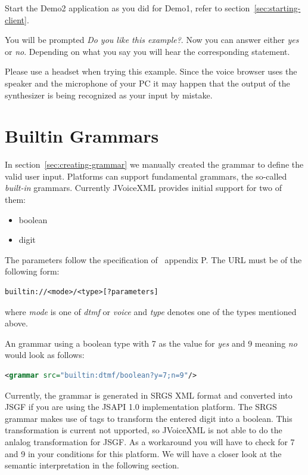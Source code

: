 \documentclass[11pt,a4paper]{book}
\begin{document}
Start the Demo2 application as you did for Demo1, refer to
section~\ref{sec:starting-client}.

You will be prompted \emph{Do you like this example?}. Now you can answer
either \emph{yes} or \emph{no}. Depending on what you say you will hear the
corresponding statement.

Please use a headset when trying this example. Since the voice browser uses the
speaker and the microphone of your PC it may happen that the output of the
synthesizer is being recognized as your input by mistake.

\section{Builtin Grammars}

In section~\ref{sec:creating-grammar} we manually created the grammar to
define the valid user input. Platforms can support fundamental grammars, the
so-called \emph{built-in} grammars. Currently JVoiceXML provides initial support
for two of them:
\begin{itemize}
  \item boolean
  \item digit
\end{itemize}

The parameters follow the specification of~\cite{w3.org:voicexml} appendix P.
The URL must be of the following form:

\begin{lstlisting}
builtin://<mode>/<type>[?parameters]
\end{lstlisting}

where \emph{mode} is one of \emph{dtmf} or \emph{voice} and \emph{type} denotes
one of the types mentioned above.

An grammar using a boolean type with 7 as the value for \emph{yes} and 9
meaning \emph{no} would look as follows:

\begin{lstlisting}[language=XML]
<grammar src="builtin:dtmf/boolean?y=7;n=9"/>
\end{lstlisting}

Currently, the grammar is generated in SRGS XML format and converted into JSGF
if you are using the JSAPI 1.0 implementation platform. The SRGS grammar
makes use of tags to transform the entered digit into a boolean. This
transformation is current not upported, so JVoiceXML is not able to do the
anlalog transformation for JSGF. As a workaround you will have to check for 7
and 9 in your conditions for this platform. We will have a closer look at the
semantic interpretation in the following section.
\end{document}
